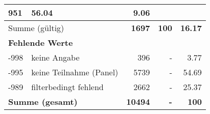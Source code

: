 \begin{longtable}{lXrrr}
       \num{951} &
       \num[round-mode=places,round-precision=2]{56.04} &
         \num[round-mode=places,round-precision=2]{9.06} \\
     \midrule
     \multicolumn{2}{l}{Summe (gültig)} &
       \textbf{\num{1697}} &
     \textbf{\num{100}} &
       \textbf{\num[round-mode=places,round-precision=2]{16.17}} \\
     \multicolumn{5}{l}{\textbf{Fehlende Werte}}\\
       -998 &
       keine Angabe &
         \num{396} &
        - &
         \num[round-mode=places,round-precision=2]{3.77} \\
       -995 &
       keine Teilnahme (Panel) &
         \num{5739} &
        - &
         \num[round-mode=places,round-precision=2]{54.69} \\
       -989 &
       filterbedingt fehlend &
         \num{2662} &
        - &
         \num[round-mode=places,round-precision=2]{25.37} \\
     \midrule
     \multicolumn{2}{l}{\textbf{Summe (gesamt)}} &
          \textbf{\num{10494}} &
        \textbf{-} &
        \textbf{\num{100}} \\
     \bottomrule
     \end{longtable}
     
